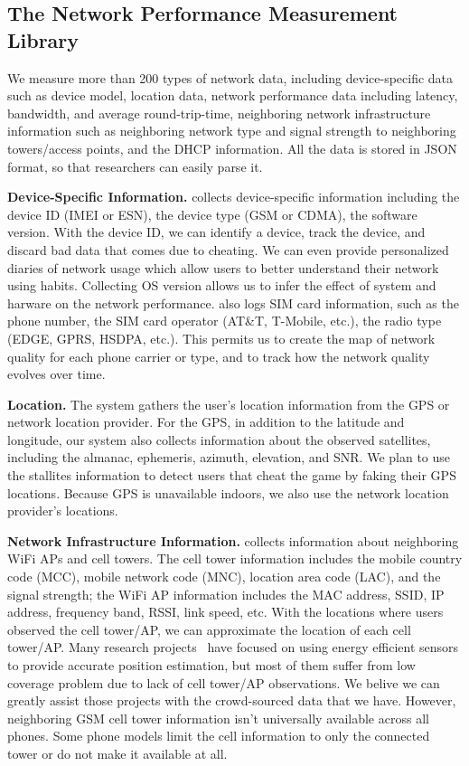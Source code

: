 \subsection{The Network Performance Measurement Library}
\label{ss:measurements}
We measure more than 200 types of network data, including device-specific data such as device model, 
location data, network performance data including latency, bandwidth, and average round-trip-time, 
neighboring network infrastructure information such as neighboring network type and signal strength to 
neighboring towers/access points, and the DHCP information. All the data is stored in JSON format, so
that researchers can easily parse it.


{\bfseries Device-Specific Information.} \name{} collects device-specific information including the device ID 
(IMEI or ESN), the device type (GSM or CDMA), the software version. With the device ID, we can 
identify a device, track the device, and discard bad data that comes due to cheating. We can 
even provide personalized diaries of network usage which allow users to better understand their network 
using habits.
Collecting OS version allows us to infer the effect of system and harware on the network performance. \name{} also 
logs SIM card information, such as the phone number, the SIM card operator (AT\&T, T-Mobile, etc.),
the radio type (EDGE, GPRS, HSDPA, etc.).
This permits us to create the map of network quality for each phone carrier or type, and to track how the network quality 
evolves over time.

{\bfseries Location.} The system gathers the user's location information from the GPS or network location provider. 
For the GPS, in addition to the latitude and longitude, our system also collects information 
about the observed satellites, including the almanac, ephemeris, azimuth, elevation, and SNR.
We plan to use the stallites information to detect users that cheat the game by faking their GPS locations.
Because GPS is unavailable indoors, we also use the network location provider's locations.


{\bfseries Network Infrastructure Information.} \name{} collects information about
neighboring WiFi APs and cell towers. The cell tower information includes the mobile country code (MCC), 
mobile network code (MNC), location area code (LAC), and the signal strength; the WiFi AP information
includes the MAC address, SSID, IP address, frequency band, RSSI, link speed, etc.
With the locations where users observed the cell tower/AP, we can approximate the location of 
each cell tower/AP. Many research projects~\cite{ctrack, vtrack-sensys09} have focused on using 
energy efficient sensors to provide accurate position estimation, but most of them suffer from
low coverage problem due to lack of cell tower/AP observations. We belive we can greatly assist those projects
with the crowd-sourced data that we have. However, neighboring GSM cell tower information isn't 
universally available across all phones. Some phone models limit the cell information to only 
the connected tower or do not make it available at all.

